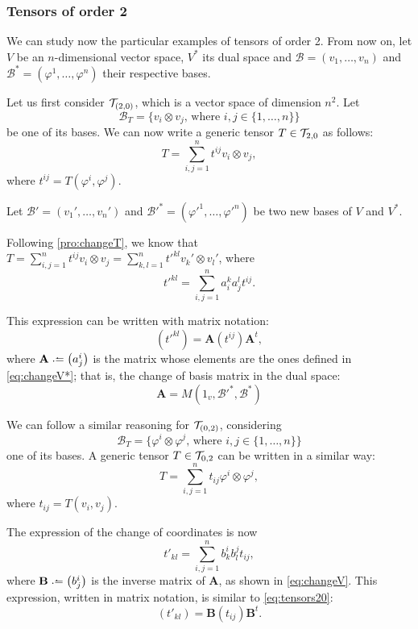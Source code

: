 \subsubsection*{Tensors of order 2}
\label{sub:order2}

We can study now the particular examples of tensors of order 2. From now on, let $V$ be an $n$-dimensional vector space, $V^*$ its dual space and $\mathcal{B} = (v_1, \dots, v_n)$ and $\mathcal{B^*} = (\varphi^1, \dots, \varphi^n)$ their respective bases.

Let us first consider ${\mathcal T}_{(2,0)}$, which is a vector space of dimension $n^2$. Let
\[
	\mathcal{B}_T = \{v_i \otimes v_j \textrm{, where } i,j \in \{1,\dots,n\}\}
\]
be one of its bases. We can now write a generic tensor $T\in{\mathcal T}_{2,0}$ as follows:
\[
	T = \sum_{i,j=1}^n t^{ij} v_i \otimes v_j,
\]
where $t^{ij} = T(\varphi^i, \varphi^j)$.

Let $\mathcal{B}' = (v_1', \dots, v_n')$ and $\mathcal{B}'^* = (\varphi'^1, \dots, \varphi'^n)$ be two new bases of $V$ and $V^*$.

Following \autoref{pro:changeT}, we know that $T = \sum_{i,j=1}^n t^{ij} v_i \otimes v_j = \sum_{k,l=1}^n t'^{kl} v_k' \otimes v_l'$, where
\[
	t'^{kl} = \sum_{i,j=1}^n a^k_i a^l_j t^{ij}.
\]

This expression can be written with matrix notation:
\begin{equation}
	\label{eq:tensors20}
	\left( t'^{kl} \right) = \mathbf{A} \left( t^{ij} \right) \mathbf{A}^t,
\end{equation}
where $\mathbf{A} \defeq \left(a_j^i\right)$ is the matrix whose elements are the ones defined in \autoref{eq:changeV*}; that is, the change of basis matrix in the dual space:
\[
	\mathbf{A} = M(1_v, \mathcal{B}'^*, \mathcal{B}^*)
\]

We can follow a similar reasoning for ${\mathcal T}_{(0,2)}$, considering
\[
\mathcal{B}_T = \{\varphi^i \otimes \varphi^j \textrm{, where } i,j \in \{1,\dots,n\}\}
\]
one of its bases. A generic tensor $T\in{\mathcal T}_{0,2}$ can be written in a similar way:
\[
T = \sum_{i,j=1}^n t_{ij} \varphi^i \otimes \varphi^j,
\]
where $t_{ij} = T(v_i, v_j)$.

The expression of the change of coordinates is now
\[
	t'_{kl} = \sum_{i,j=1}^n b_k^i b_l^j t_{ij},
\]
where $\mathbf{B} \defeq \left( b^i_j \right)$ is the inverse matrix of $\mathbf{A}$, as shown in \autoref{eq:changeV}. This expression, written in matrix notation, is similar to \autoref{eq:tensors20}:
\begin{equation}
	\label{eq:tensors02}
	\left( t'_{kl} \right) = \mathbf{B} \left( t_{ij} \right) \mathbf{B}^t.
\end{equation}

